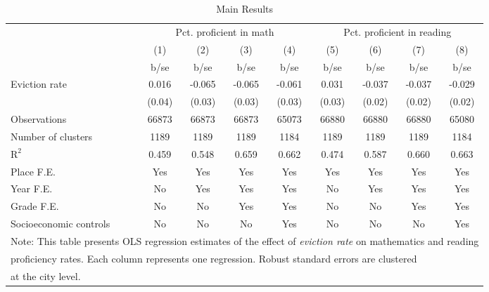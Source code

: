 \begin{table}[htbp]\centering
\def\sym#1{\ifmmode^{#1}\else\(^{#1}\)\fi}
\caption{Main Results}
\begin{tabular}{l*{8}{c}}
\toprule
                    &\multicolumn{4}{c}{Pct. proficient in math}        &\multicolumn{4}{c}{Pct. proficient in reading}     \\\cmidrule(lr){2-5}\cmidrule(lr){6-9}
                    &\multicolumn{1}{c}{(1)}&\multicolumn{1}{c}{(2)}&\multicolumn{1}{c}{(3)}&\multicolumn{1}{c}{(4)}&\multicolumn{1}{c}{(5)}&\multicolumn{1}{c}{(6)}&\multicolumn{1}{c}{(7)}&\multicolumn{1}{c}{(8)}\\
                    &        b/se&        b/se&        b/se&        b/se&        b/se&        b/se&        b/se&        b/se\\
\midrule
Eviction rate       &       0.016&      -0.065&      -0.065&      -0.061&       0.031&      -0.037&      -0.037&      -0.029\\
                    &      (0.04)&      (0.03)&      (0.03)&      (0.03)&      (0.03)&      (0.02)&      (0.02)&      (0.02)\\
\midrule
Observations        &       66873&       66873&       66873&       65073&       66880&       66880&       66880&       65080\\
Number of clusters  &        1189&        1189&        1189&        1184&        1189&        1189&        1189&        1184\\
$\text{R}^2$        &       0.459&       0.548&       0.659&       0.662&       0.474&       0.587&       0.660&       0.663\\
Place F.E.          &         Yes&         Yes&         Yes&         Yes&         Yes&         Yes&         Yes&         Yes\\
Year F.E.           &          No&         Yes&         Yes&         Yes&          No&         Yes&         Yes&         Yes\\
Grade F.E.          &          No&          No&         Yes&         Yes&          No&          No&         Yes&         Yes\\
Socioeconomic controls&          No&          No&          No&         Yes&          No&          No&          No&         Yes\\
\bottomrule
\multicolumn{9}{l}{\footnotesize Note: This table presents OLS regression estimates of the effect of \emph{eviction rate} on mathematics and reading}\\
\multicolumn{9}{l}{\footnotesize proficiency rates. Each column represents one regression. Robust standard errors are clustered}\\
\multicolumn{9}{l}{\footnotesize at the city level.}\\
\end{tabular}
\end{table}
